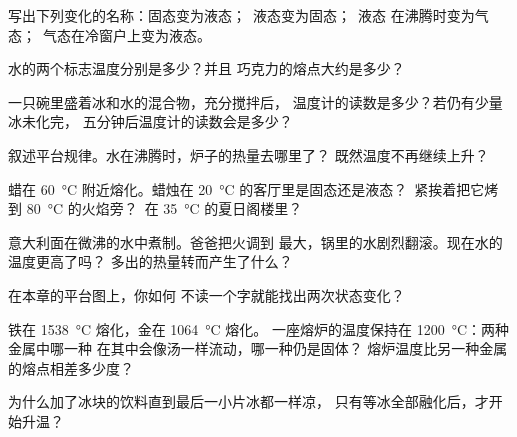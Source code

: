 \begin{exercise}[$\star$]\label{exo:g4:changes-of-state:1}
写出下列变化的名称：固态变为液态；\ 液态变为固态；\ 液态
在沸腾时变为气态；\ 气态在冷窗户上变为液态。
\end{exercise}

\begin{exercise}[$\star$]\label{exo:g4:changes-of-state:2}
水的两个标志温度分别是多少？并且
巧克力的熔点大约是多少？
\end{exercise}

\begin{exercise}[$\star$]\label{exo:g4:changes-of-state:3}
一只碗里盛着冰和水的混合物，充分搅拌后，
温度计的读数是多少？若仍有少量冰未化完，
五分钟后温度计的读数会是多少？
\end{exercise}

\begin{exercise}[$\star$]\label{exo:g4:changes-of-state:4}
叙述平台规律。水在沸腾时，炉子的热量去哪里了？
既然温度不再继续上升？
\end{exercise}

\begin{exercise}[$\star$]\label{exo:g4:changes-of-state:5}
蜡在 \qty{60}{\celsius} 附近熔化。蜡烛在
\qty{20}{\celsius} 的客厅里是固态还是液态？\ 紧挨着把它烤到
\qty{80}{\celsius} 的火焰旁？\ 在 \qty{35}{\celsius} 的夏日阁楼里？
\end{exercise}

\begin{exercise}[$\star$]\label{exo:g4:changes-of-state:6}
意大利面在微沸的水中煮制。爸爸把火调到
最大，锅里的水剧烈翻滚。现在水的温度更高了吗？
多出的热量转而产生了什么？
\end{exercise}

\begin{exercise}[$\star$]\label{exo:g4:changes-of-state:7}
在本章的平台图上，你如何
不读一个字就能找出两次状态变化？
\end{exercise}

\begin{exercise}[$\star$]\label{exo:g4:changes-of-state:8}
铁在 \qty{1538}{\celsius} 熔化，金在 \qty{1064}{\celsius} 熔化。
一座熔炉的温度保持在 \qty{1200}{\celsius}：两种金属中哪一种
在其中会像汤一样流动，哪一种仍是固体？
熔炉温度比另一种金属的熔点相差多少度？
\end{exercise}

\begin{exercise}[$\star$]\label{exo:g4:changes-of-state:9}
为什么加了冰块的饮料直到最后一小片冰都一样凉，
只有等冰全部融化后，才开始升温？
\end{exercise}


